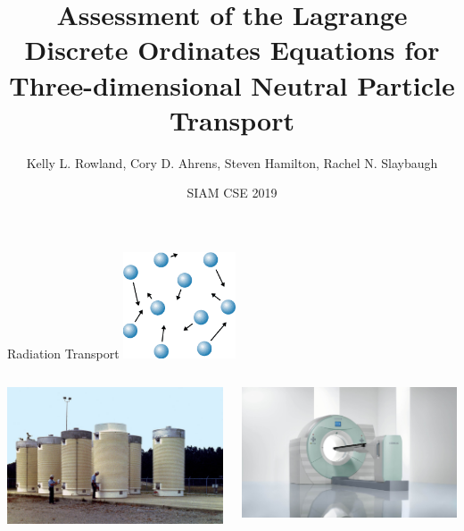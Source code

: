 \documentclass{beamer}
\title[Assessment of the LDO Equations for 3D Neutral Particle Transport]
{Assessment of the Lagrange Discrete Ordinates Equations for Three-dimensional Neutral Particle Transport}
\author[Kelly L. Rowland et al.]{Kelly L. Rowland, Cory D. Ahrens, Steven Hamilton, Rachel N. Slaybaugh}
\date{SIAM CSE 2019}
\begin{document}
\begin{frame}[plain]
	\titlepage
\end{frame}

\begin{frame}{Radiation Transport}
%
\pause
%
\center
\includegraphics[width=0.25\textwidth,natwidth=212,natheight=200]{img/particles.png}
%
\pause
%
\begin{columns}
\begin{column}{0.5\textwidth}
\center
\includegraphics[width=\textwidth,natwidth=1024,natheight=648]{img/nuclear_dry_storage.jpg}
\end{column}
\begin{column}{0.5\textwidth}
\center
\includegraphics[width=\textwidth,natwidth=2369,natheight=1433]{img/pet-spect.jpg}
\end{column}
\end{columns}
%
\end{frame}
\end{document}
